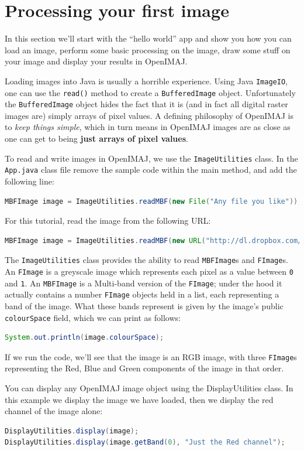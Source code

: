 \documentclass[10pt,a4paper,twoside,extrafontsizes]{memoir}
\begin{document}
\chapter{Processing your first image}
In this section we'll start with the ``hello world'' app and show you how you can load an image, 
perform some basic processing on the image, draw some stuff on your image and display your 
results in OpenIMAJ.

Loading images into Java is usually a horrible experience. Using Java \verb+ImageIO+, one can use the 
\verb+read()+ method to create a \verb+BufferedImage+ object. Unfortunately the \verb+BufferedImage+ 
object hides the fact that it is (and in fact all digital raster images are) simply arrays of pixel 
values. A defining philosophy of OpenIMAJ is to \emph{keep things simple}, which in turn means in OpenIMAJ 
images are as close as one can get to being \textbf{just arrays of pixel values}.

To read and write images in OpenIMAJ, we use the \verb+ImageUtilities+ class. In the \verb+App.java+ 
class file remove the sample code within the main method, and add the following line:
\begin{lstlisting}[language=java]
MBFImage image = ImageUtilities.readMBF(new File("Any file you like"));
\end{lstlisting}
For this tutorial, read the image from the following URL:
\begin{lstlisting}[language=java]
MBFImage image = ImageUtilities.readMBF(new URL("http://dl.dropbox.com/u/8705593/sinaface.jpg"));
\end{lstlisting}
The \verb+ImageUtilities+ class provides the ability to read \verb+MBFImage+s and \verb+FImage+s. 
An \verb+FImage+ is a greyscale image which represents each pixel as a value between \verb+0+ and 
\verb+1+. An \verb+MBFImage+ is a Multi-band version of the \verb+FImage+; under the hood it actually
contains a number \verb+FImage+ objects held in a list, each representing a band of the image. 
What these bands represent is given by the image's public \verb+colourSpace+ field, which we 
can print as follows:
\begin{lstlisting}[language=java]
System.out.println(image.colourSpace);
\end{lstlisting}
If we run the code, we'll see that the image is an RGB image, with three \verb+FImage+s representing 
the Red, Blue and Green components of the image in that order.

You can display any OpenIMAJ image object using the DisplayUtilities class. In this example we display
the image we have loaded, then we display the red channel of the image alone:
\begin{lstlisting}[language=java]
DisplayUtilities.display(image);
DisplayUtilities.display(image.getBand(0), "Just the Red channel");
\end{lstlisting}
\end{document}
